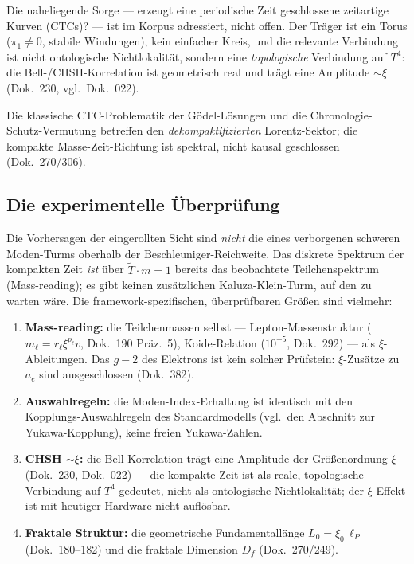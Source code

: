 Die naheliegende Sorge --- erzeugt eine periodische Zeit geschlossene zeitartige Kurven (CTCs)? --- ist im Korpus adressiert, nicht offen. Der Träger ist ein Torus ($\pi_1\neq0$, stabile Windungen), kein einfacher Kreis, und die relevante Verbindung ist nicht ontologische Nichtlokalität, sondern eine \emph{topologische} Verbindung auf $T^4$: die Bell-/CHSH-Korrelation ist geometrisch real und trägt eine Amplitude $\sim\xi$ (Dok.~230, vgl.\ Dok.~022).

Die klassische CTC-Problematik der Gödel-Lösungen und die Chronologie-Schutz-Vermutung betreffen den \emph{dekompaktifizierten} Lorentz-Sektor; die kompakte Masse-Zeit-Richtung ist spektral, nicht kausal geschlossen (Dok.~270/306).

\subsection{Die experimentelle Überprüfung}

Die Vorhersagen der eingerollten Sicht sind \emph{nicht} die eines verborgenen schweren Moden-Turms oberhalb der Beschleuniger-Reichweite. Das diskrete Spektrum der kompakten Zeit \emph{ist} über $\tilde{T}\cdot m = 1$ bereits das beobachtete Teilchenspektrum (Mass-reading); es gibt keinen zusätzlichen Kaluza-Klein-Turm, auf den zu warten wäre. Die framework-spezifischen, überprüfbaren Größen sind vielmehr:
\begin{enumerate}[leftmargin=1.6em,itemsep=0.2em]
 \item \textbf{Mass-reading:} die Teilchenmassen selbst --- Lepton-Massenstruktur ($m_\ell=r_\ell\xi^{p_\ell}v$, Dok.~190 Präz.~5), Koide-Relation ($10^{-5}$, Dok.~292) --- als $\xi$-Ableitungen. Das $g-2$ des Elektrons ist kein solcher Prüfstein: $\xi$-Zusätze zu $a_e$ sind ausgeschlossen (Dok.~382).
 \item \textbf{Auswahlregeln:} die Moden-Index-Erhaltung ist identisch mit den Kopplungs-Auswahlregeln des Standardmodells (vgl.\ den Abschnitt zur Yukawa-Kopplung), keine freien Yukawa-Zahlen.
 \item \textbf{CHSH $\sim \xi$:} die Bell-Korrelation trägt eine Amplitude der Größenordnung $\xi$ (Dok.~230, Dok.~022) --- die kompakte Zeit ist als reale, topologische Verbindung auf $T^4$ gedeutet, nicht als ontologische Nichtlokalität; der $\xi$-Effekt ist mit heutiger Hardware nicht auflösbar.
 \item \textbf{Fraktale Struktur:} die geometrische Fundamentallänge $L_0 = \xi_0\,\ell_P$ (Dok.~180--182) und die fraktale Dimension $D_f$ (Dok.~270/249).
\end{enumerate}

